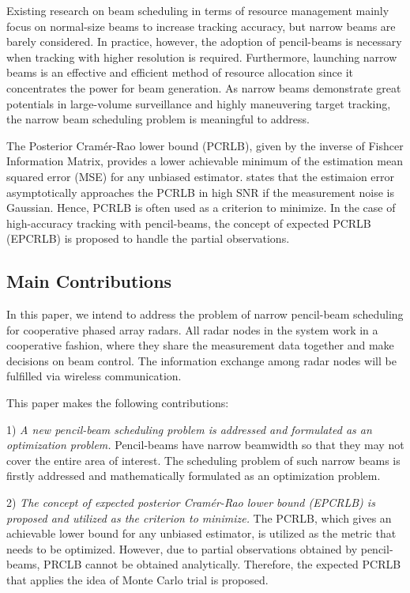 \documentclass[12pt,journal,draftclsnofoot,onecolumn]{IEEEtran}
\begin{document}
Existing research on beam scheduling in terms of resource management mainly focus on normal-size beams to increase tracking accuracy, but narrow beams are barely considered. In practice, however, the adoption of pencil-beams is necessary when tracking with higher resolution is required. Furthermore, launching narrow beams is an effective and efficient method of resource allocation since it concentrates the power for beam generation. As narrow beams demonstrate great potentials in large-volume surveillance and highly maneuvering target tracking, the narrow beam scheduling problem is meaningful to address.  

The Posterior Cramér-Rao lower bound (PCRLB), given by the inverse of Fishcer Information Matrix, provides a lower achievable minimum of the estimation mean squared error (MSE) for any unbiased estimator\cite{tichavsky1998posterior}. \cite{niu2012target} states that the estimaion error asymptotically approaches the PCRLB in high SNR if the measurement noise is Gaussian. Hence, PCRLB is often used as a criterion to minimize. In the case of high-accuracy tracking with pencil-beams, the concept of expected PCRLB (EPCRLB) is proposed to handle the partial observations.



\subsection{Main Contributions}
In this paper, we intend to address the problem of narrow pencil-beam scheduling for cooperative phased array radars. All radar nodes in the system work in a cooperative fashion, where they share the measurement data together and make decisions on beam control. The information exchange among radar nodes will be fulfilled via wireless communication.

This paper makes the following contributions:

1) \emph{A new pencil-beam scheduling problem is addressed and formulated as an optimization problem.} Pencil-beams have narrow beamwidth so that they may not cover the entire area of interest. The scheduling problem of such narrow beams is firstly addressed and mathematically formulated as an optimization problem.

2) \emph{The concept of expected posterior Cramér-Rao lower bound (EPCRLB) is proposed and utilized as the criterion to minimize.} The PCRLB, which gives an achievable lower bound for any unbiased estimator, is utilized as the metric that needs to be optimized. However, due to partial observations obtained by pencil-beams, PRCLB cannot be obtained analytically. Therefore, the expected PCRLB that applies the idea of Monte Carlo trial is proposed.
\end{document}
